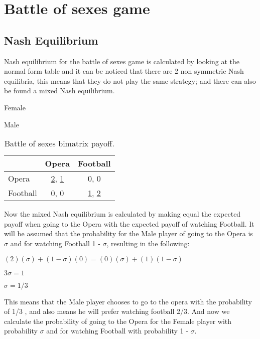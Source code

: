 \section{Battle of sexes game}
\label{app:bosnashess}

\subsection{Nash Equilibrium}
 Nash equilibrium for the battle of sexes game is calculated by looking at the normal form table and it can be noticed that there are 2 non symmetric Nash equilibria, this means that they do not play the same strategy; and there can also be found a mixed Nash equilibrium.

\begin{table}[H]
\begin{center}
Female

Male
\begin{tabular}{|l|c|c|}
\hline
 & Opera & Football\\ 
\hline
Opera & \underline{2}, \underline{1} & 0, 0\\
\hline
Football & 0, 0 & \underline{1}, \underline{2}\\
\hline
\end{tabular}

\caption{ Battle of sexes bimatrix payoff.}
\label{fig:mpnashbos}	
\end{center}
\end{table}

Now the mixed Nash equilibrium is calculated by making equal the expected payoff  when going to the Opera with the expected payoff of watching Football. It will be assumed that the probability for the Male player of going to the Opera is $\sigma$ and for watching Football 1 - $\sigma$, resulting in the following:
\begin{center}
$(2)(\sigma) + (1 - \sigma)(0) = (0)(\sigma) + (1)(1 - \sigma)$
\end{center}
\begin{center}
$3\sigma = 1$
\end{center}
\begin{center}
$\sigma = 1/3$
\end{center}
This means that the Male player chooses to go to the opera with the probability of 1/3 , and also means he will prefer watching football 2/3. And now we calculate the probability of going to the Opera for the Female player with probability $\sigma$ and for watching Football with probability 1 - $\sigma$.

